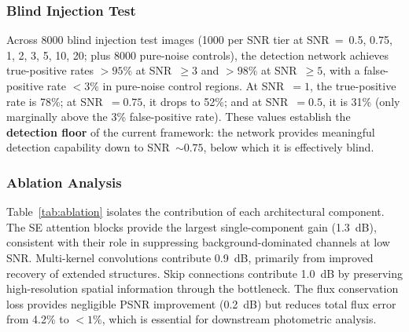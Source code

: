 \documentclass[usenatbib]{mnras}
\begin{document}
\subsubsection{Blind Injection Test}

Across 8000 blind injection test images (1000 per SNR tier at SNR~=~0.5, 0.75, 1, 2, 3, 5, 10, 20; plus 8000 pure-noise controls), the detection network achieves true-positive rates $>95\%$ at SNR~$\geq 3$ and $>98\%$ at SNR~$\geq 5$, with a false-positive rate $<3\%$ in pure-noise control regions. At SNR~$=1$, the true-positive rate is 78\%; at SNR~$=0.75$, it drops to 52\%; and at SNR~$=0.5$, it is 31\% (only marginally above the 3\% false-positive rate). These values establish the \textbf{detection floor} of the current framework: the network provides meaningful detection capability down to SNR~$\sim 0.75$, below which it is effectively blind.

\subsubsection{Ablation Analysis}\label{sec:ablation}

Table~\ref{tab:ablation} isolates the contribution of each architectural component. The SE attention blocks provide the largest single-component gain (1.3~dB), consistent with their role in suppressing background-dominated channels at low SNR. Multi-kernel convolutions contribute 0.9~dB, primarily from improved recovery of extended structures. Skip connections contribute 1.0~dB by preserving high-resolution spatial information through the bottleneck. The flux conservation loss provides negligible PSNR improvement (0.2~dB) but reduces total flux error from 4.2\% to $<1\%$, which is essential for downstream photometric analysis.
\end{document}
